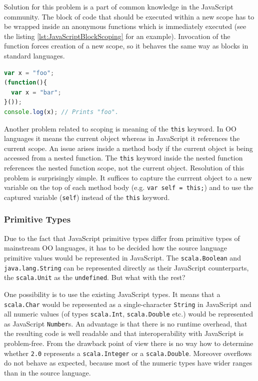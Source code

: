 \documentclass[12pt,a4paper]{report}
\begin{document}
Solution for this problem is a part of common knowledge in the JavaScript community. The block of code that should be executed within a new scope has to be wrapped inside an anonymous functions which is immediately executed (see the listing \ref{lst:JavaScriptBlockScoping} for an example). Invocation of the function forces creation of a new scope, so it behaves the same way as blocks in standard languages.

\begin{lstlisting}[language=JavaScript,caption={Emulation of block scope in JavaScript.},label={lst:JavaScriptBlockScoping}]
var x = "foo";
(function(){ 
  var x = "bar";
}());
console.log(x); // Prints "foo".
\end{lstlisting}

Another problem related to scoping is meaning of the \texttt{this} keyword. In OO languages it means the current object whereas in JavaScript it references the current scope. An issue arises inside a method body if the current object is being accessed from a nested function. The \texttt{this} keyword inside the nested function references the nested function scope, not the current object. Resolution of this problem is surprisingly simple. It suffices to capture the currrent object to a new variable on the top of each method body (e.g. \texttt{var self = this;}) and to use the captured variable (\texttt{self}) instead of the \texttt{this} keyword.

\subsubsection*{Primitive Types}

Due to the fact that JavaScript primitive types differ from primitive types of mainstream OO languages, it has to be decided how the source language primitive values  would be represented in JavaScript. The \texttt{scala.Boolean} and \texttt{java.lang.String} can be represented directly as their JavaScript counterparts, the \texttt{scala.Unit} as the \texttt{undefined}. But what with the rest? 

One possibility is to use the existing JavaScript types. It means that a \texttt{scala.Char} would be represented as a single-character \texttt{String} in JavaScript and all numeric values (of types \texttt{scala.Int}, \texttt{scala.Double} etc.) would be represented as JavaScript \texttt{Number}s. An advantage is that there is no runtime overhead, that the resulting code is well readable and that interoperability with JavaScript is problem-free. From the drawback point of view there is no way how to determine whether \texttt{2.0} represents a \texttt{scala.Integer} or a \texttt{scala.Double}. Moreover overflows do not behave as expected, because most of the numeric types have wider ranges than in the source language.
\end{document}
